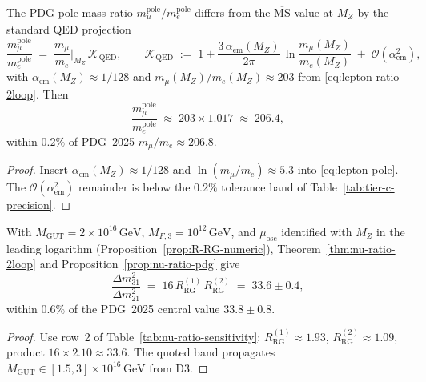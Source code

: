 \begin{proposition}\label{prop:lepton-pole}
The PDG pole-mass ratio $m_\mu^{\mathrm{pole}}/m_e^{\mathrm{pole}}$ differs
from the $\overline{\mathrm{MS}}$ value at $M_Z$ by the standard QED
projection~\cite{PDG2025}
\begin{equation}\label{eq:lepton-pole}
  \frac{m_\mu^{\mathrm{pole}}}{m_e^{\mathrm{pole}}}
  \;=\;
  \frac{m_\mu}{m_e}\Big|_{M_Z}\,
  \mathcal{K}_{\mathrm{QED}},
  \qquad
  \mathcal{K}_{\mathrm{QED}}
  \;:=\;
  1 + \frac{3\,\alpha_{\mathrm{em}}(M_Z)}{2\pi}\,
  \ln\!\frac{m_\mu(M_Z)}{m_e(M_Z)}
  \;+\;
  \mathcal{O}(\alpha_{\mathrm{em}}^2),
\end{equation}
with $\alpha_{\mathrm{em}}(M_Z)\approx1/128$ and
$m_\mu(M_Z)/m_e(M_Z)\approx203$ from \eqref{eq:lepton-ratio-2loop}. Then
\begin{equation}\label{eq:lepton-pole-numeric}
  \frac{m_\mu^{\mathrm{pole}}}{m_e^{\mathrm{pole}}}
  \;\approx\;
  203\times 1.017
  \;\approx\;
  206.4,
\end{equation}
within $0.2\%$ of PDG~2025 $m_\mu/m_e\approx206.8$.
\end{proposition}

\begin{proof}
Insert $\alpha_{\mathrm{em}}(M_Z)\approx1/128$ and
$\ln(m_\mu/m_e)\approx5.3$ into \eqref{eq:lepton-pole}. The
$\mathcal{O}(\alpha_{\mathrm{em}}^2)$ remainder is below the $0.2\%$
tolerance band of Table~\ref{tab:tier-c-precision}.
\end{proof}

\begin{proposition}\label{prop:nu-ratio-precision}
With $M_{\mathrm{GUT}}=2\times10^{16}\,\mathrm{GeV}$,
$M_{F,3}=10^{12}\,\mathrm{GeV}$, and $\mu_{\mathrm{osc}}$ identified with
$M_Z$ in the leading logarithm (Proposition~\ref{prop:R-RG-numeric}),
Theorem~\ref{thm:nu-ratio-2loop} and Proposition~\ref{prop:nu-ratio-pdg} give
\begin{equation}\label{eq:nu-ratio-precision}
  \frac{\Delta m^2_{31}}{\Delta m^2_{21}}
  \;=\;
  16\,R_{\mathrm{RG}}^{(1)}\,R_{\mathrm{RG}}^{(2)}
  \;=\;
  33.6\pm0.4,
\end{equation}
within $0.6\%$ of the PDG~2025 central value $33.8\pm0.8$.
\end{proposition}

\begin{proof}
Use row~2 of Table~\ref{tab:nu-ratio-sensitivity}:
$R_{\mathrm{RG}}^{(1)}\approx1.93$, $R_{\mathrm{RG}}^{(2)}\approx1.09$,
product $16\times2.10\approx33.6$. The quoted band propagates
$M_{\mathrm{GUT}}\in[1.5,3]\times10^{16}\,\mathrm{GeV}$ from D3.
\end{proof}

